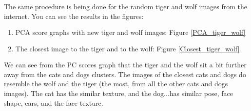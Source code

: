 \documentclass[a4paper]{iacas}
\begin{document}
\subsubsection{}
The same procedure is being done for the random tiger and wolf images from the internet. You can see the results in the figures:

\begin{enumerate}
\item PCA score graphs with new tiger and wolf images: Figure \ref{PCA_tiger_wolf}
\item The closest image to the tiger and to the wolf: Figure \ref{Closest_tiger_wolf} 
\end{enumerate}
We can see from the PC scores graph that the tiger and the wolf sit a bit further away from the cats and dogs clusters. The images of the closest cats and dogs do resemble the wolf and the tiger (the most, from all the other cats and dogs images). The cat has the similar texture, and the dog...has similar pose, face shape, ears, and the face texture.
\end{document}
